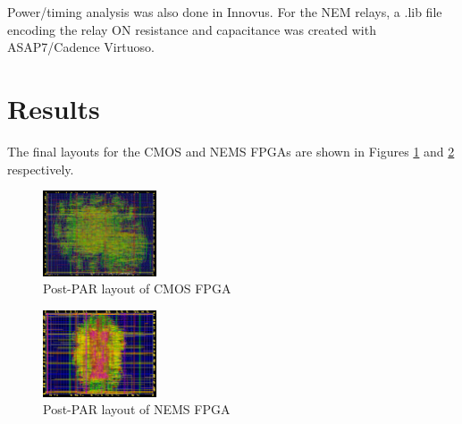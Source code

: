 \documentclass[twoside,twocolumn]{article}
\begin{document}
Power/timing analysis was also done in Innovus. For the NEM relays, a .lib file encoding the relay ON resistance and capacitance was created with ASAP7/Cadence Virtuoso.




\section{Results}
The final layouts for the CMOS and NEMS FPGAs are shown in Figures \ref{fig:cmos}
and \ref{fig:NEMS} respectively. 

\begin{figure}[!hbt]
    \centering
    \includegraphics[width=0.3\textwidth]{figs/cmos_innovus.png}
    \caption{Post-PAR layout of CMOS FPGA}
    \label{fig:cmos}
\end{figure}

\begin{figure}[!hbt]
    \includegraphics[width=0.3\textwidth]{figs/nems_innovus.png}
    \centering
    \caption{Post-PAR layout of NEMS FPGA}
    \label{fig:NEMS}    
\end{figure}
\end{document}
